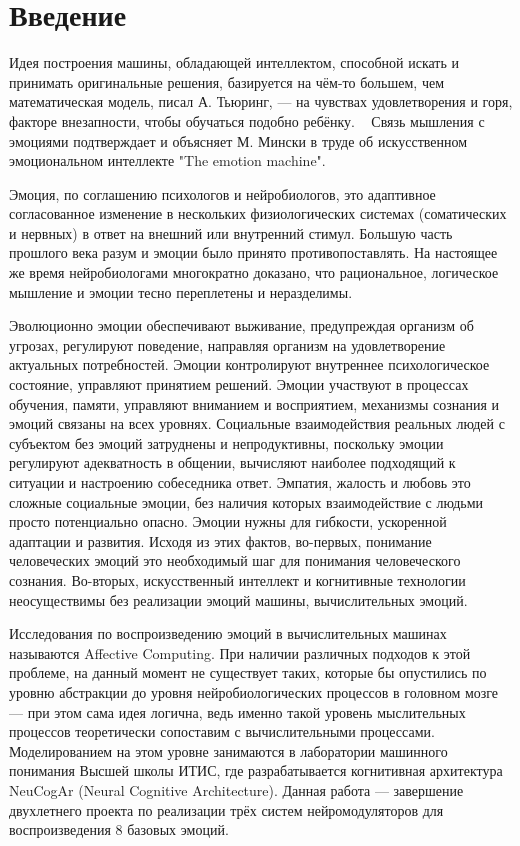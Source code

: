 \cleardoublepage
{}
{}
\chapter*{Введение}
\label{chap:introduction}
Идея построения машины, обладающей интеллектом, способной искать и принимать оригинальные решения, базируется на чём-то большем, чем математическая модель, писал А. Тьюринг, — на чувствах удовлетворения и горя, факторе внезапности, чтобы обучаться подобно ребёнку. ~\cite{intelligent_machinery} Связь мышления с эмоциями подтверждает и объясняет М. Мински в труде об искусственном эмоциональном интеллекте "The emotion machine".~\cite{minsky2007}


Эмоция, по соглашению психологов и нейробиологов, это адаптивное согласованное изменение в нескольких физиологических системах (соматических и нервных) в ответ на внешний или внутренний стимул.\cite{plutchik2001} Большую часть прошлого века разум и эмоции было принято противопоставлять. На настоящее же время нейробиологами многократно доказано, что рациональное, логическое мышление и эмоции тесно переплетены и неразделимы.\cite{Brosch, ziemke-role, damasio2008, damasio1994}


Эволюционно эмоции обеспечивают выживание, предупреждая  организм об угрозах, регулируют поведение, направляя организм на удовлетворение актуальных потребностей.\cite{whoneedsemotions} Эмоции контролируют внутреннее психологическое состояние, управляют принятием решений.\cite{roleofemotions} Эмоции участвуют в процессах обучения, памяти, управляют вниманием и восприятием, механизмы сознания и эмоций связаны на всех уровнях.\cite{Phelps2006} Социальные взаимодействия реальных людей с субъектом без эмоций затруднены и непродуктивны, поскольку эмоции регулируют адекватность в общении, вычисляют наиболее подходящий к ситуации и настроению собеседника ответ. Эмпатия, жалость и любовь это сложные социальные эмоции, без наличия которых взаимодействие с людьми просто потенциально опасно. Эмоции нужны для гибкости, ускоренной адаптации и развития. Исходя из этих фактов, во-первых, понимание человеческих эмоций это необходимый шаг для понимания человеческого сознания. Во-вторых, искусственный интеллект и когнитивные технологии неосуществимы без реализации эмоций машины, вычислительных эмоций.\cite{affectivecomputing}


Исследования по воспроизведению эмоций в вычислительных машинах называются Affective Computing.\cite{affectivecomputingchallenges} При наличии различных подходов к этой проблеме, на данный момент не существует таких, которые бы опустились по уровню абстракции до уровня нейробиологических процессов в головном мозге — при этом сама идея логична, ведь именно такой уровень мыслительных процессов теоретически сопоставим с вычислительными процессами. Моделированием на этом уровне занимаются в лаборатории машинного понимания Высшей школы ИТИС, где разрабатывается когнитивная архитектура NeuCogAr (Neural Cognitive Architecture). Данная работа — завершение двухлетнего проекта по реализации трёх систем нейромодуляторов для воспроизведения 8 базовых эмоций.


